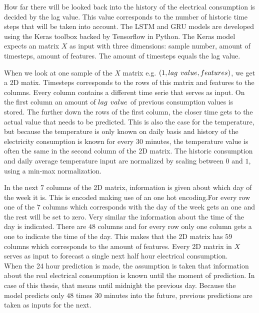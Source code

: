 How far there will be looked back into the history of the electrical consumption is decided by the lag value. This value corresponds to the number of historic time steps that will be taken into account. The LSTM and GRU models are developed using the Keras toolbox backed by Tensorflow in Python. The Keras model expects an matrix $ X $ as input with three dimensions: sample number, amount of timesteps, amount of features. The amount of timesteps equals the lag value.

When we look at one sample of the $ X $ matrix e.g. $ (1,lag\hspace{1.5mm}value, features) $, we get a 2D matix. Timesteps corresponds to the rows of this matrix and features to the columns. Every column contains a different time serie that serves as input. On the first column an amount of $ lag\hspace{1.5mm}value $ of previous consumption values is stored. The further down the rows of the first column, the closer time gets to the actual value that needs to be predicted. This is also the case for the temperature, but because the temperature is only known on daily basis and history of the electricity consumption is known for every 30 minutes, the temperature value is often the same in the second column of the 2D matrix. The historic consumption and daily average temperature input are normalized by scaling between $ 0 $ and $ 1 $, using a min-max normalization.

In the next $ 7 $ columns of the 2D matrix, information is given about which day of the week it is. This is encoded making use of an one hot encoding.For every row one of the $ 7 $ columns which corresponds with the day of the week gets an one and the rest will be set to zero. Very similar the information about the time of the day is indicated. There are $ 48 $ columns and for every row only one column gets a one to indicate the time of the day. This makes that the 2D matrix has $ 59  $ columns which corresponds to the amount of features. Every 2D matrix in $ X $ serves as input to forecast a single next half hour electrical consumption.\\

When the 24 hour prediction is made, the assumption is taken that information about the real electrical consumption is known until the moment of prediction. In case of this thesis, that means until midnight the previous day. Because the model predicts only $ 48 $ times $ 30 $ minutes into the future, previous predictions are taken as inputs for the next.\\

